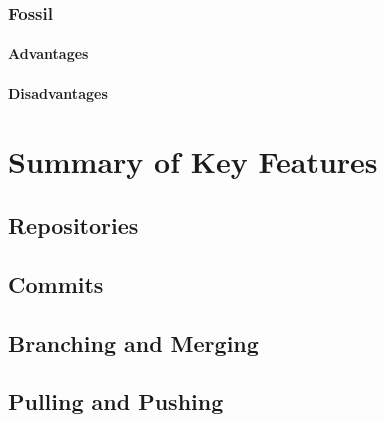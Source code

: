 \subsubsection{Fossil}
\paragraph{Advantages}
\paragraph{Disadvantages}
\section{Summary of Key Features}
\subsection{Repositories}
\subsection{Commits}
\subsection{Branching and Merging}
\subsection{Pulling and Pushing}
